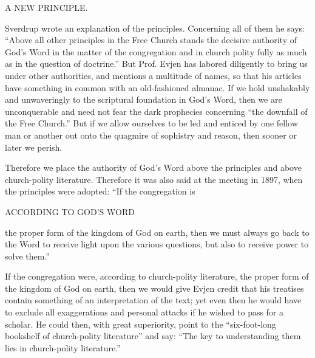 A NEW PRINCIPLE.

Sverdrup wrote an explanation of the principles. Concerning all of them he says: “Above all other principles in the Free Church stands the decisive authority of God’s Word in the matter of the congregation and in church polity fully as much as in the question of doctrine.” But Prof. Evjen has labored diligently to bring us under other authorities, and mentions a multitude of names, so that his articles have something in common with an old-fashioned almanac. If we hold unshakably and unwaveringly to the scriptural foundation in God’s Word, then we are unconquerable and need not fear the dark prophecies concerning “the downfall of the Free Church.” But if we allow ourselves to be led and enticed by one fellow man or another out onto the quagmire of sophistry and reason, then sooner or later we perish.

Therefore we place the authority of God’s Word above the principles and above church-polity literature. Therefore it was also said at the meeting in 1897, when the principles were adopted: “If the congregation is

ACCORDING TO GOD’S WORD

the proper form of the kingdom of God on earth, then we must always go back to the Word to receive light upon the various questions, but also to receive power to solve them.”

If the congregation were, according to church-polity literature, the proper form of the kingdom of God on earth, then we would give Evjen credit that his treatises contain something of an interpretation of the text; yet even then he would have to exclude all exaggerations and personal attacks if he wished to pass for a scholar. He could then, with great superiority, point to the “six-foot-long bookshelf of church-polity literature” and say: “The key to understanding them lies in church-polity literature.”

